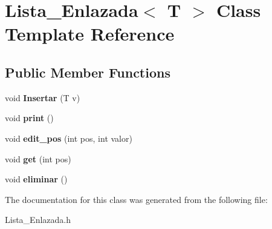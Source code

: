 \hypertarget{classLista__Enlazada}{}\section{Lista\+\_\+\+Enlazada$<$ T $>$ Class Template Reference}
\label{classLista__Enlazada}
\subsection*{Public Member Functions}
\begin{DoxyCompactItemize}
\item 
\mbox{\label{classLista__Enlazada_aeed418c611bc71845d23085d00a4666f}} 
void {\bfseries Insertar} (T v)
\item 
\mbox{\label{classLista__Enlazada_aebc717567d7a95e6dc4e02b37b4d718d}} 
void {\bfseries print} ()
\item 
\mbox{\label{classLista__Enlazada_ae4906f1e863b23f8cd8cf916164fd94f}} 
void {\bfseries edit\+\_\+pos} (int pos, int valor)
\item 
\mbox{\label{classLista__Enlazada_a40662dd90db6089a472c3222dddfc9aa}} 
void {\bfseries get} (int pos)
\item 
\mbox{\label{classLista__Enlazada_a845a18a0f4ccee6b1caf23a604d0bfda}} 
void {\bfseries eliminar} ()
\end{DoxyCompactItemize}


The documentation for this class was generated from the following file\+:\begin{DoxyCompactItemize}
\item 
Lista\+\_\+\+Enlazada.\+h\end{DoxyCompactItemize}
